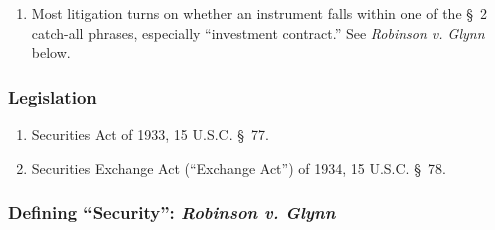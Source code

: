\begin{enumerate}
\begin{enumerate}
        \item The registration requirements of the Securities Act may apply 
        (but there are exemptions).
        \item ``In general, plaintiffs have a much easier time when they bring 
        suit under the securities laws than than they would if they had to bring 
        suit under state common law fraud rules.''\footnote{Casebook p. 400.}
    \end{enumerate}
    \item Most litigation turns on whether an instrument falls within one of the 
    \S\ 2 catch-all phrases, especially ``investment contract.'' See 
    \emph{Robinson v. Glynn} below.
\end{enumerate}

\subsubsection{Legislation}

\begin{enumerate}
    \item Securities Act of 1933, 15 U.S.C. \S\ 77.
    \item Securities Exchange Act (``Exchange Act'') of 1934, 15 U.S.C. \S\ 78.
\end{enumerate}

\subsubsection{Defining ``Security'': \emph{Robinson v. Glynn}}

